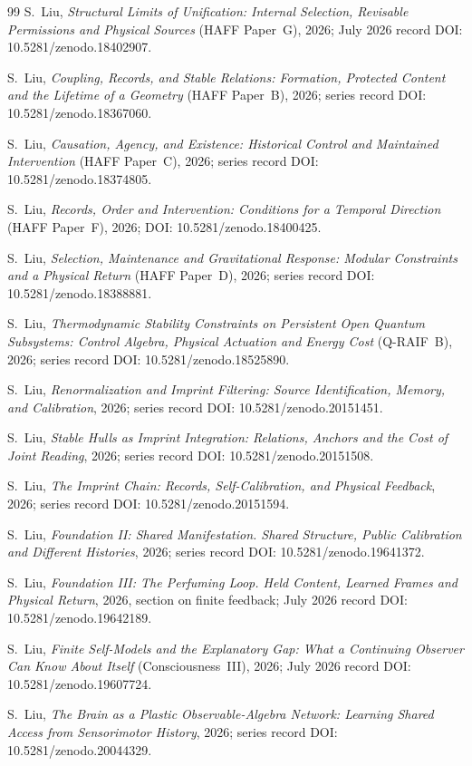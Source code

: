 \documentclass[11pt,a4paper]{article}
\begin{document}
\begin{thebibliography}{99}
S.~Liu, \emph{Structural Limits of Unification: Internal Selection, Revisable Permissions and Physical Sources} (HAFF Paper~G), 2026; July 2026 record DOI: 10.5281/zenodo.18402907.

S.~Liu, \emph{Coupling, Records, and Stable Relations: Formation, Protected Content and the Lifetime of a Geometry} (HAFF Paper~B), 2026; series record DOI: 10.5281/zenodo.18367060.

S.~Liu, \emph{Causation, Agency, and Existence: Historical Control and Maintained Intervention} (HAFF Paper~C), 2026; series record DOI: 10.5281/zenodo.18374805.

S.~Liu, \emph{Records, Order and Intervention: Conditions for a Temporal Direction} (HAFF Paper~F), 2026; DOI: 10.5281/zenodo.18400425.

S.~Liu, \emph{Selection, Maintenance and Gravitational Response: Modular Constraints and a Physical Return} (HAFF Paper~D), 2026; series record DOI: 10.5281/zenodo.18388881.

S.~Liu, \emph{Thermodynamic Stability Constraints on Persistent Open Quantum Subsystems: Control Algebra, Physical Actuation and Energy Cost} (Q-RAIF~B), 2026; series record DOI: 10.5281/zenodo.18525890.

S.~Liu, \emph{Renormalization and Imprint Filtering: Source Identification, Memory, and Calibration}, 2026; series record DOI: 10.5281/zenodo.20151451.

S.~Liu, \emph{Stable Hulls as Imprint Integration: Relations, Anchors and the Cost of Joint Reading}, 2026; series record DOI: 10.5281/zenodo.20151508.

S.~Liu, \emph{The Imprint Chain: Records, Self-Calibration, and Physical Feedback}, 2026; series record DOI: 10.5281/zenodo.20151594.

S.~Liu, \emph{Foundation II: Shared Manifestation. Shared Structure, Public Calibration and Different Histories}, 2026; series record DOI: 10.5281/zenodo.19641372.

S.~Liu, \emph{Foundation III: The Perfuming Loop. Held Content, Learned Frames and Physical Return}, 2026, section on finite feedback; July 2026 record DOI: 10.5281/zenodo.19642189.

S.~Liu, \emph{Finite Self-Models and the Explanatory Gap: What a Continuing Observer Can Know About Itself} (Consciousness~III), 2026; July 2026 record DOI: 10.5281/zenodo.19607724.

S.~Liu, \emph{The Brain as a Plastic Observable-Algebra Network: Learning Shared Access from Sensorimotor History}, 2026; series record DOI: 10.5281/zenodo.20044329.
\end{thebibliography}
\end{document}
